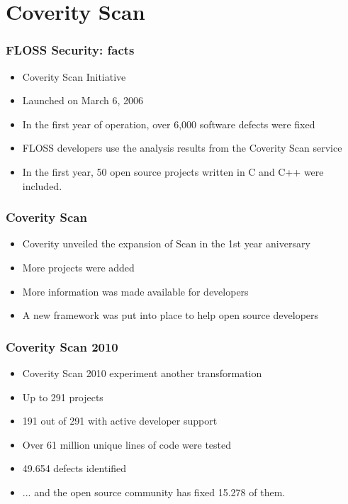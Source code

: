 \documentclass{beamer}
\begin{document}
\section{Coverity Scan}

\begin{frame}
\frametitle{FLOSS Security: facts}
\begin{itemize}
\item Coverity Scan Initiative
\item Launched on March 6, 2006 
\item In the first year of operation, over 6,000 software defects were fixed
\item FLOSS developers use the analysis results from the Coverity Scan service
\item In the first year, 50 open source projects written in C and C++ were included.
\end{itemize}
\end{frame}

\begin{frame}
\frametitle{Coverity Scan}
\begin{itemize}
\item Coverity unveiled the expansion of Scan in the 1st year aniversary 
\item More projects were added
\item More information was made available for developers 
\item A new framework was put into place to help open source developers
\end{itemize}
\end{frame}


\begin{frame}
\frametitle{Coverity Scan 2010}
\begin{itemize}
\item Coverity Scan 2010 experiment another transformation
\item Up to 291 projects
\item 191 out of 291 with active developer support
\item Over 61 million unique lines of code were tested
\item 49.654 defects identified 
\item ... and the open source community has fixed 15.278 of them.
\end{itemize}
\end{frame}
\end{document}
